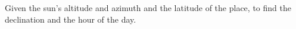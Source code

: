 Given the sun's altitude and azimuth and the 
latitude of the place, to find the declination
and the hour of the day.

